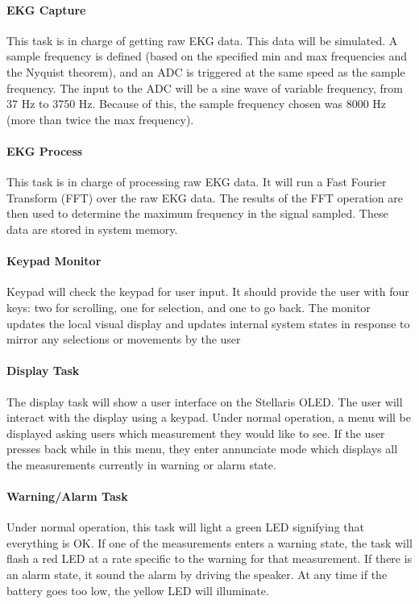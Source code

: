 \documentclass[12pt]{article} %
\begin{document}
    \paragraph{EKG Capture} This task is in charge of getting raw EKG data.  This data
    will be simulated.  A sample frequency is defined (based on the specified min and max
    frequencies and the Nyquist theorem), and an ADC is triggered at the same speed as
    the sample frequency.  The input to the ADC will be a sine wave of variable
    frequency, from 37 Hz to 3750 Hz.  Because of this, the sample frequency
    chosen was 8000 Hz (more than twice the max frequency).

    \paragraph{EKG Process} This task is in charge of processing raw EKG data.
		It will run a Fast Fourier Transform (FFT) over the raw EKG data. The results of the FFT operation
		are then used to determine the maximum frequency in the signal sampled.
		These data are stored in system memory.

    \paragraph{Keypad Monitor} Keypad will check the keypad for user input. It
    should provide the user with four keys: two for scrolling, one for selection,
		and one to go back. The monitor updates the local visual display  and
		updates internal system states in response to mirror any selections or
		movements by the user

    \paragraph{Display Task} The display task will show a user interface on the
    Stellaris OLED. The user will interact with the display using a keypad. Under
    normal operation, a menu will be displayed asking users which measurement they
    would like to see. If the user presses back while in this menu, they enter
    annunciate mode which displays all the measurements currently in warning or
    alarm state.

    \paragraph{Warning/Alarm Task} Under normal operation, this task will light a
    green LED signifying that everything is OK. If one of the measurements enters
    a warning state, the task will flash a red LED at a rate specific to the
    warning for that measurement. If there is an alarm state, it sound the alarm
    by driving the speaker. At any time if the battery goes too low, the yellow
    LED will illuminate.
\end{document}
